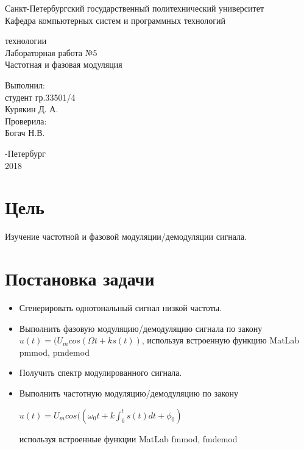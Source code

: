 \documentclass[a4paper,12pt]{article}
\begin{document}
\begin{center}
Санкт-Петербургский государственный политехнический университет
\\Кафедра компьютерных систем и программных технологий
\end{center}
\vspace*{10em plus .6em minus .5em}

\begin{center}
{ технологии
\\Лабораторная работа №5
\\Частотная и фазовая модуляция}
\end{center}

\vspace*{5em plus .6em minus .5em}
\begin{flushright}
Выполнил:\\студент гр.33501/4\\Курякин Д. А.\\Проверила:\\Богач Н.В.
\end{flushright}

\vspace*{15em plus .6em minus .5em}
\begin{center}
{-Петербург
\\2018}
\end{center}
\pagestyle{empty}
\newpage
\pagestyle{plain}

\section{Цель}

Изучение частотной и фазовой модуляции/демодуляции сигнала.

\section{Постановка задачи}

\begin{itemize}
	\item Сгенерировать однотональный сигнал низкой частоты.
	\item Выполнить фазовую модуляцию/демодуляцию сигнала по закону $u(t)=(U_mcos (\Omega t+ks(t))$, используя встроенную функцию MatLab pmmod, pmdemod
	\item Получить спектр модулированного сигнала.
	\item Выполнить частотную модуляцию/демодуляцию по закону
	
	$u(t)=U_mcos((\omega_0 t+k\int_{0}^{t}s(t)dt+\phi_0)$
	
	используя встроенные функции MatLab fmmod, fmdemod
\end{itemize}
\end{document}

